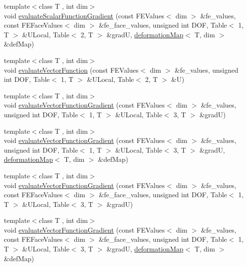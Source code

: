\begin{DoxyCompactItemize}
\item 
{\footnotesize template$<$class T , int dim$>$ }\\void \hyperlink{group___evaluation_functions_gabedd4ae2841d2332ed0df0513b189e34}{evaluate\-Scalar\-Function\-Gradient} (const F\-E\-Values$<$ dim $>$ \&fe\-\_\-values, const F\-E\-Face\-Values$<$ dim $>$ \&fe\-\_\-face\-\_\-values, unsigned int D\-O\-F, Table$<$ 1, T $>$ \&U\-Local, Table$<$ 2, T $>$ \&grad\-U, \hyperlink{structdeformation_map}{deformation\-Map}$<$ T, dim $>$ \&def\-Map)
\item 
{\footnotesize template$<$class T , int dim$>$ }\\void \hyperlink{group___evaluation_functions_gab9e164be1be244df81c932426a4bd513}{evaluate\-Vector\-Function} (const F\-E\-Values$<$ dim $>$ \&fe\-\_\-values, unsigned int D\-O\-F, Table$<$ 1, T $>$ \&U\-Local, Table$<$ 2, T $>$ \&U)
\item 
{\footnotesize template$<$class T , int dim$>$ }\\void \hyperlink{group___evaluation_functions_ga84eb2ee714466f113c96fcf6a9fd23e8}{evaluate\-Vector\-Function\-Gradient} (const F\-E\-Values$<$ dim $>$ \&fe\-\_\-values, unsigned int D\-O\-F, Table$<$ 1, T $>$ \&U\-Local, Table$<$ 3, T $>$ \&grad\-U)
\item 
{\footnotesize template$<$class T , int dim$>$ }\\void \hyperlink{group___evaluation_functions_ga5adf8aa2d91dbdf393aa91dcc65e42e8}{evaluate\-Vector\-Function\-Gradient} (const F\-E\-Values$<$ dim $>$ \&fe\-\_\-values, unsigned int D\-O\-F, Table$<$ 1, T $>$ \&U\-Local, Table$<$ 3, T $>$ \&grad\-U, \hyperlink{structdeformation_map}{deformation\-Map}$<$ T, dim $>$ \&def\-Map)
\item 
{\footnotesize template$<$class T , int dim$>$ }\\void \hyperlink{group___evaluation_functions_gab2771d18ff704decbbc12ca2b848bbfe}{evaluate\-Vector\-Function\-Gradient} (const F\-E\-Values$<$ dim $>$ \&fe\-\_\-values, const F\-E\-Face\-Values$<$ dim $>$ \&fe\-\_\-face\-\_\-values, unsigned int D\-O\-F, Table$<$ 1, T $>$ \&U\-Local, Table$<$ 3, T $>$ \&grad\-U)
\item 
{\footnotesize template$<$class T , int dim$>$ }\\void \hyperlink{group___evaluation_functions_ga9608539d601a91aff1ba01ccc720fbe0}{evaluate\-Vector\-Function\-Gradient} (const F\-E\-Values$<$ dim $>$ \&fe\-\_\-values, const F\-E\-Face\-Values$<$ dim $>$ \&fe\-\_\-face\-\_\-values, unsigned int D\-O\-F, Table$<$ 1, T $>$ \&U\-Local, Table$<$ 3, T $>$ \&grad\-U, \hyperlink{structdeformation_map}{deformation\-Map}$<$ T, dim $>$ \&def\-Map)

\end{DoxyCompactItemize}
